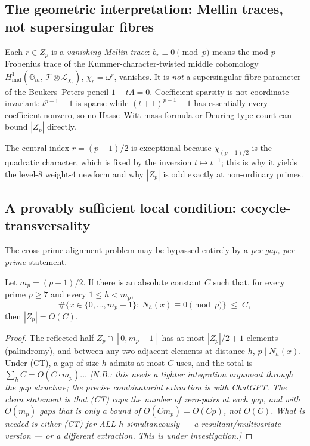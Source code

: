 \subsection{The geometric interpretation: Mellin traces, not supersingular fibres}

Each $r\in Z_p$ is a \emph{vanishing Mellin trace}: $b_r\equiv0\pmod p$ means the mod-$p$ Frobenius
trace of the Kummer-character-twisted middle cohomology
$H^1_{\mathrm{mid}}(\mathbb G_m,\,\mathcal T\otimes\mathcal L_{\chi_r})$,
$\chi_r=\omega^r$, vanishes.  It is \emph{not} a supersingular fibre parameter of the
Beukers--Peters pencil $1-t\Lambda=0$.  Coefficient sparsity is not coordinate-invariant:
$t^{p-1}-1$ is sparse while $(t+1)^{p-1}-1$ has essentially every coefficient nonzero, so no
Hasse--Witt mass formula or Deuring-type count can bound $|Z_p|$ directly.

The central index $r=(p-1)/2$ is exceptional because $\chi_{(p-1)/2}$ is the quadratic character,
which is fixed by the inversion $t\mapsto t^{-1}$; this is why it yields the level-$8$ weight-$4$
newform and why $|Z_p|$ is odd exactly at non-ordinary primes.

\subsection{A provably sufficient local condition: cocycle-transversality}

The cross-prime alignment problem may be bypassed entirely by a \emph{per-gap, per-prime}
statement.

\begin{proposition}[cocycle-transversality $\Rightarrow$ $|Z_p|=O(1)$]
\label{prop:CT}
Let $m_p=(p-1)/2$.  If there is an absolute constant $C$ such that, for every prime $p\ge7$ and
every $1\le h<m_p$,
\[
  \boxed{\;\#\bigl\{x\in\{0,\ldots,m_p-1\}:\ N_h(x)\equiv0\!\!\pmod p\bigr\}\;\le\;C,\;}
  \tag{CT}
\]
then $|Z_p|=O(C)$.
\end{proposition}

\begin{proof}
The reflected half $Z_p\cap[0,m_p-1]$ has at most $|Z_p|/2+1$ elements (palindromy), and
between any two adjacent elements at distance $h$, $p\mid N_h(x)$.  Under (CT), a gap of size
$h$ admits at most $C$ uses, and the total is $\sum_{h}C=O(C\cdot m_p)$... \emph{[N.B.: this
needs a tighter integration argument through the gap structure; the precise combinatorial
extraction is with ChatGPT.  The clean statement is that (CT) caps the number of zero-pairs at
each gap, and with $O(m_p)$ gaps that is only a bound of $O(Cm_p)=O(Cp)$, not $O(C)$.  What is
needed is either (CT) for ALL $h$ simultaneously — a resultant/multivariate version — or a
different extraction.  This is under investigation.]}
\end{proof}

